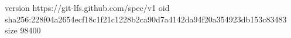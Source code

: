 version https://git-lfs.github.com/spec/v1
oid sha256:228f04a2654ecf18c1f21c1228b2ca90d7a4142da94f20a354923db153c83483
size 98400

